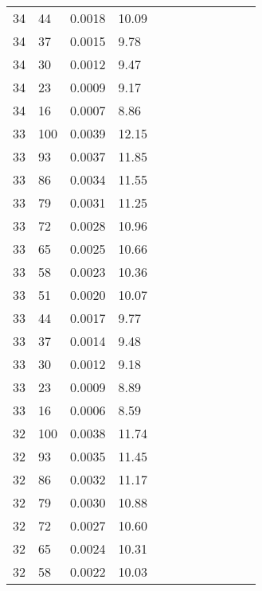 \begin{tabular}{llll|llll|llll}
34 & 44 & 0.0018 & 10.09 &  &  &  &  &  &  &  & \\
34 & 37 & 0.0015 & 9.78 &  &  &  &  &  &  &  & \\
34 & 30 & 0.0012 & 9.47 &  &  &  &  &  &  &  & \\
34 & 23 & 0.0009 & 9.17 &  &  &  &  &  &  &  & \\
34 & 16 & 0.0007 & 8.86 &  &  &  &  &  &  &  & \\
33 & 100 & 0.0039 & 12.15 &  &  &  &  &  &  &  & \\
33 & 93 & 0.0037 & 11.85 &  &  &  &  &  &  &  & \\
33 & 86 & 0.0034 & 11.55 &  &  &  &  &  &  &  & \\
33 & 79 & 0.0031 & 11.25 &  &  &  &  &  &  &  & \\
33 & 72 & 0.0028 & 10.96 &  &  &  &  &  &  &  & \\
33 & 65 & 0.0025 & 10.66 &  &  &  &  &  &  &  & \\
33 & 58 & 0.0023 & 10.36 &  &  &  &  &  &  &  & \\
33 & 51 & 0.0020 & 10.07 &  &  &  &  &  &  &  & \\
33 & 44 & 0.0017 & 9.77 &  &  &  &  &  &  &  & \\
33 & 37 & 0.0014 & 9.48 &  &  &  &  &  &  &  & \\
33 & 30 & 0.0012 & 9.18 &  &  &  &  &  &  &  & \\
33 & 23 & 0.0009 & 8.89 &  &  &  &  &  &  &  & \\
33 & 16 & 0.0006 & 8.59 &  &  &  &  &  &  &  & \\
32 & 100 & 0.0038 & 11.74 &  &  &  &  &  &  &  & \\
32 & 93 & 0.0035 & 11.45 &  &  &  &  &  &  &  & \\
32 & 86 & 0.0032 & 11.17 &  &  &  &  &  &  &  & \\
32 & 79 & 0.0030 & 10.88 &  &  &  &  &  &  &  & \\
32 & 72 & 0.0027 & 10.60 &  &  &  &  &  &  &  & \\
32 & 65 & 0.0024 & 10.31 &  &  &  &  &  &  &  & \\
32 & 58 & 0.0022 & 10.03 &  &  &  &  &  &  &  & \\
\bottomrule
\end{tabular}
\newpage
